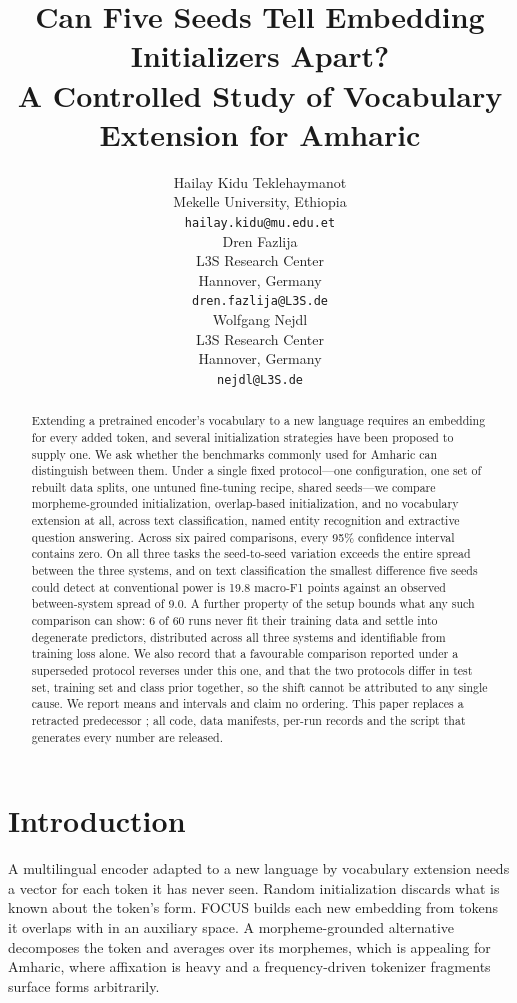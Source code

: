 \documentclass[11pt]{article}
\title{Can Five Seeds Tell Embedding Initializers Apart?\\
A Controlled Study of Vocabulary Extension for Amharic}
\author{Hailay Kidu Teklehaymanot \\
  Mekelle University, Ethiopia \\
  \texttt{hailay.kidu@mu.edu.et} \\\And
  Dren Fazlija \\
  L3S Research Center \\
  Hannover, Germany \\
  \texttt{dren.fazlija@L3S.de} \\\And
  Wolfgang Nejdl \\
  L3S Research Center \\
  Hannover, Germany \\
  \texttt{nejdl@L3S.de} \\}
\begin{document}
\maketitle

\begin{abstract}
Extending a pretrained encoder's vocabulary to a new language requires an
embedding for every added token, and several initialization strategies have
been proposed to supply one. We ask whether the benchmarks commonly used for
Amharic can distinguish between them. Under a single fixed protocol---one
configuration, one set of rebuilt data splits, one untuned fine-tuning
recipe, shared seeds---we compare morpheme-grounded initialization,
overlap-based initialization, and no vocabulary extension at all, across
text classification, named entity recognition and extractive question
answering. Across six paired comparisons, every 95\% confidence interval
contains zero. On all three tasks the seed-to-seed variation exceeds the
entire spread between the three systems, and on text classification the
smallest difference five seeds could detect at conventional power is 19.8
macro-F1 points against an observed between-system spread of 9.0. A further property of the setup
bounds what any such comparison can show: 6 of 60 runs never fit their
training data and settle into degenerate predictors, distributed across all
three systems and identifiable from training loss alone. We also record that
a favourable comparison reported under a superseded protocol reverses under
this one, and that the two protocols differ in test set, training set and
class prior together, so the shift cannot be attributed to any single cause.
We report means and intervals and claim no ordering. This paper replaces a
retracted predecessor \citep{teklehaymanot-etal-2026-lgse}; all code, data
manifests, per-run records and the script that generates every number are
released.
\end{abstract}

\section{Introduction}

A multilingual encoder adapted to a new language by vocabulary extension
needs a vector for each token it has never seen. Random initialization
discards what is known about the token's form. FOCUS
\citep{dobler-de-melo-2023-focus} builds each new embedding from tokens it
overlaps with in an auxiliary space. A morpheme-grounded alternative
decomposes the token and averages over its morphemes, which is appealing for
Amharic, where affixation is heavy and a frequency-driven tokenizer
fragments surface forms arbitrarily.
\end{document}
